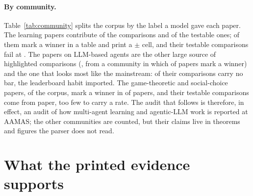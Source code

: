 \documentclass[sigconf,anonymous]{aamas}
\begin{document}
\paragraph{By community.} Table~\ref{tab:community} splits the corpus by the
label a model gave each paper. The learning papers contribute
\nCLearningComparisons{} of the \nAComparisons{} comparisons and
\nCLearningNTestable{} of the \nANTestable{} testable ones;
\nCLearningClaimPapers{} of them mark a winner in a table and
\nCLearningPapersErr{} print a $\pm$ cell, and their testable comparisons
fail at \nCLearningFail{}. The papers on LLM-based agents are the other
large source of highlighted comparisons (\nCLlmAgentsComparisons{}, from a
community in which \nCLlmAgentsClaimPapers{} of papers mark a winner) and
the one that looks most like the mainstream: \nCLlmAgentsNeither{} of their
comparisons carry no bar, the leaderboard habit imported. The
game-theoretic and social-choice papers, \nCGameTheorySocialChoicePapers{}
of the corpus, mark a winner in \nCGameTheorySocialChoiceClaimPapers{} of
papers, and their \nCGameTheorySocialChoiceNTestable{} testable
comparisons come from \nCGameTheorySocialChoiceTestablePapers{} paper, too
few to carry a rate. The audit that follows is therefore,
in effect, an audit of how multi-agent learning and agentic-LLM work is
reported at AAMAS; the other communities are counted, but their claims live
in theorems and figures the parser does not read.

\section{What the printed evidence supports}
\label{sec:support}
\end{document}
